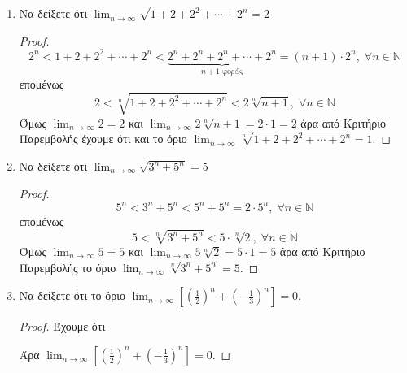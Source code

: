 \documentclass[a4paper,table]{report}
\begin{document}
\begin{enumerate}
    \item Να δείξετε ότι $ \lim_{n \to \infty} \sqrt{1+2+2^{2}+\cdots+2^{n}} = 2 $
      \begin{proof}
        \[
          2^{n} < 1+2+2^{2}+\cdots + 2^{n} < 
          \underbrace{2^{n}+2^{n}+2^{n}+\cdots +2^{n}}_{n+1\; \text{φορές}}= (n+1)
          \cdot 2^{n}, \; \forall n \in \mathbb{N}
        \] 
        επομένως
        \[
          2 < \sqrt[n]{1+2+2^{2}+\cdots+2^{n}} < 2 \sqrt[n]{n+1} , \; \forall n \in
          \mathbb{N} 
        \] 
        Όμως $ \lim_{n \to \infty} 2 = 2 $ και $ \lim_{n \to \infty} 2\sqrt[n]{n+1} = 2
        \cdot 1 = 2 $
        άρα από Κριτήριο Παρεμβολής έχουμε ότι και το όριο
        $ \lim_{n \to \infty} \sqrt[n]{1+2+2^{2}+\cdots+2^{n}} = 1 $.
      \end{proof}

    \item Να δείξετε ότι $ \lim_{n \to \infty} \sqrt{3^{n}+5^{n}} = 5 $
      \begin{proof}
       \[
         5^{n} < 3^{n}+5^{n} < 5^{n}+5^{n} = 2\cdot 5^{n}, \; \forall n \in \mathbb{N} 
        \] 
        επομένως
        \[
          5 < \sqrt[n]{3^{n}+5^{n}} < 5\cdot \sqrt[n]{2} , \; \forall n \in \mathbb{N}
         \] 
        Όμως $ \lim_{n \to \infty} 5 = 5 $ και $ \lim_{n \to \infty} 5\sqrt[n]{2} = 5
        \cdot 1 = 5 $
        άρα από Κριτήριο Παρεμβολής το όριο
        $ \lim_{n \to \infty} \sqrt[n]{3^{n}+5^{n}} = 5 $.
      \end{proof}

    \item Να δείξετε ότι το όριο $ \lim_{n \to \infty} \left[(\frac{1}{2} )^{n}+
      (-\frac{1}{3} )^{n}\right] = 0 $.
      \begin{proof}
        Έχουμε ότι 
        Άρα $ \lim_{n \to \infty} \left[(\frac{1}{2} )^{n}+
      (-\frac{1}{3} )^{n}\right] = 0 $.
      \end{proof}


\end{enumerate}
\end{document}
